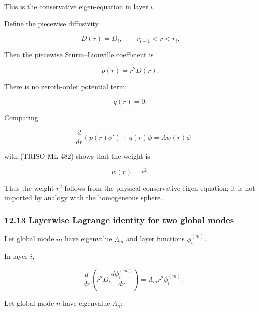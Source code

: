 \documentclass[11pt,a4paper]{article}
\begin{document}
This is the conservative eigen-equation in layer $i$.

Define the piecewise diffusivity

\begin{equation}
D(r)=D_i,
\qquad
r_{i-1}<r<r_i.
\tag{TRISO-ML-483}
\label{eq:triso-ml-483}
\end{equation}

Then the piecewise Sturm–Liouville coefficient is

\begin{equation}
\boxed{
p(r)=r^2D(r).
}
\tag{TRISO-ML-484}
\label{eq:triso-ml-484}
\end{equation}

There is no zeroth-order potential term:

\begin{equation}
\boxed{
q(r)=0.
}
\tag{TRISO-ML-485}
\label{eq:triso-ml-485}
\end{equation}

Comparing

\begin{equation}
-\frac{d}{dr}
\left(
p(r)\phi'
\right)
+
q(r)\phi
=
\Lambda w(r)\phi
\tag{TRISO-ML-486}
\label{eq:triso-ml-486}
\end{equation}

with (TRISO-ML-482) shows that the weight is

\begin{equation}
\boxed{
w(r)=r^2.
}
\tag{TRISO-ML-487}
\label{eq:triso-ml-487}
\end{equation}

Thus the weight $r^2$ follows from the physical conservative eigen-equation; it is not imported by analogy with the homogeneous sphere.

\subsubsection*{12.13 Layerwise Lagrange identity for two global modes}

Let global mode $m$ have eigenvalue $\Lambda_m$ and layer functions $\phi_i^{(m)}$.

In layer $i$,

\begin{equation}
-\frac{d}{dr}
\left(
r^2D_i\frac{d\phi_i^{(m)}}{dr}
\right)
=
\Lambda_m r^2\phi_i^{(m)}.
\tag{TRISO-ML-488}
\label{eq:triso-ml-488}
\end{equation}

Let global mode $n$ have eigenvalue $\Lambda_n$:
\end{document}
